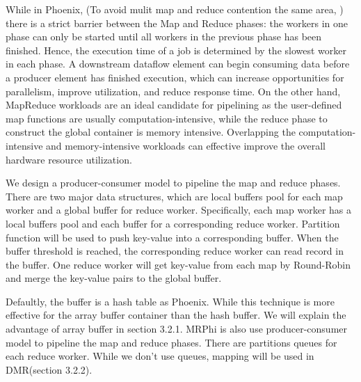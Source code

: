 While in Phoenix, (To avoid mulit map and reduce contention the same area, )
there is a strict barrier between the Map and Reduce phases: 
the workers in one phase can only be started 
until all workers in the previous phase has been finished. 
Hence, the execution time of a job is determined by the
slowest worker in each phase. 
A downstream dataflow element can begin consuming data
before a producer element has finished execution, which can
increase opportunities for parallelism, improve utilization,
and reduce response time.
On the other hand, MapReduce workloads
are an ideal candidate for pipelining as the user-defined
map functions are usually computation-intensive, while the
reduce phase to construct the global container is memory
intensive\cite{talbot2011phoenix++}.
Overlapping the
computation-intensive and memory-intensive workloads 
can effective improve the overall hardware resource utilization.

We design a producer-consumer model to pipeline the
map and reduce phases.
There are two major data structures,
which are local buffers pool for each map worker and 
a global buffer for reduce worker.
Specifically, 
each map worker has a local buffers pool and 
each buffer for a corresponding reduce worker.
Partition function will be used to push key-value into a corresponding
buffer.
When the buffer threshold is reached,
the corresponding reduce worker can read record in the buffer.
One reduce worker will get key-value from each map by Round-Robin and 
merge the key-value pairs to the global buffer.


Defaultly, the buffer is a hash table as Phoenix.
While this technique is more effective for the array buffer
container than the hash buffer. 
We will explain the advantage of array buffer in section 3.2.1.
MRPhi\cite{lu2013mrphi} is also use producer-consumer model to 
pipeline the map and reduce phases. 
There are partitions queues for each reduce worker.
While we don't use queues, mapping will be used in DMR(section 3.2.2).

